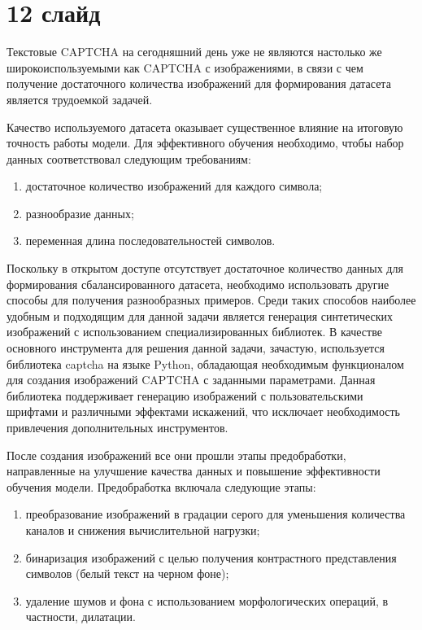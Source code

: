 \documentclass{altsu-report}
\begin{document}
\section*{12 слайд}

Текстовые CAPTCHA на сегодняшний день уже не являются настолько же 
широкоиспользуемыми как CAPTCHA с изображениями, в связи с чем получение 
достаточного количества изображений для формирования датасета является трудоемкой 
задачей.

Качество используемого датасета оказывает существенное влияние на итоговую 
точность работы модели. Для эффективного обучения необходимо, чтобы набор данных 
соответствовал следующим требованиям:

\begin{enumerate}
    \item достаточное количество изображений для каждого символа;
    \item разнообразие данных;
    \item переменная длина последовательностей символов.
\end{enumerate}

Поскольку в открытом доступе отсутствует достаточное количество данных для 
формирования сбалансированного датасета, необходимо использовать другие способы 
для получения разнообразных примеров. Среди таких способов наиболее удобным и 
подходящим для данной задачи является генерация синтетических изображений с 
использованием специализированных библиотек. В качестве основного инструмента 
для решения данной задачи, зачастую, используется библиотека captcha на языке 
Python, обладающая необходимым функционалом для создания изображений CAPTCHA с 
заданными параметрами. Данная библиотека поддерживает генерацию изображений с 
пользовательскими шрифтами и различными эффектами искажений, что исключает 
необходимость привлечения дополнительных инструментов.

После создания изображений все они прошли этапы предобработки, направленные на 
улучшение качества данных и повышение эффективности обучения модели. 
Предобработка включала следующие этапы:

\begin{enumerate}
    \item преобразование изображений в градации серого для уменьшения количества 
    каналов и снижения вычислительной нагрузки;
    \item бинаризация изображений с целью получения контрастного представления 
    символов (белый текст на черном фоне);
    \item удаление шумов и фона с использованием морфологических операций, в 
    частности, дилатации.
\end{enumerate}
\end{document}
